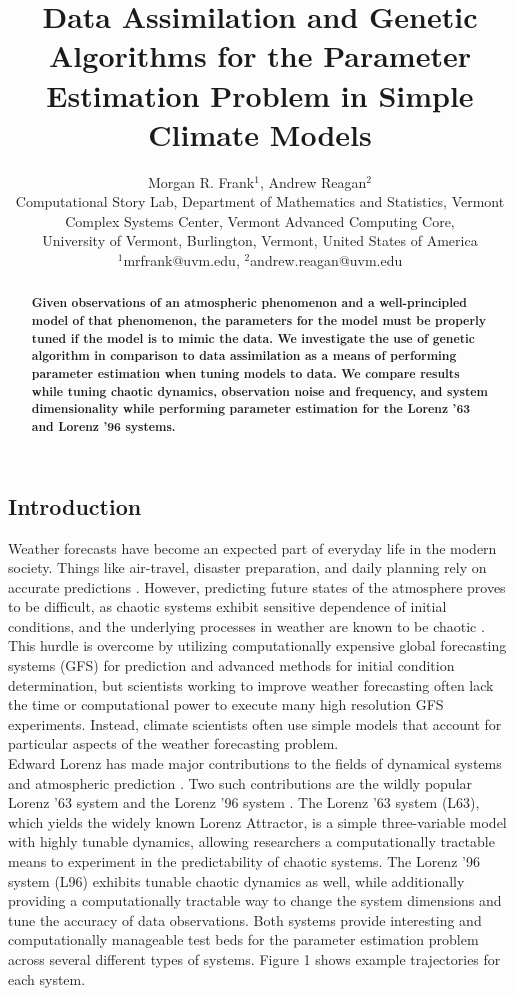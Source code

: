 \documentclass[onecolumn]{article}
\title{Data Assimilation and Genetic Algorithms for the Parameter Estimation Problem in Simple Climate Models}
\author{Morgan R. Frank$^{1}$, Andrew Reagan$^{2}$\\
 {\footnotesize  Computational Story Lab, Department of Mathematics and Statistics, Vermont Complex Systems Center, Vermont Advanced Computing Core,}\\
{\footnotesize University of Vermont, Burlington, Vermont, United States of America }\\
{\footnotesize$^{1}$mrfrank@uvm.edu, $^{2}$andrew.reagan@uvm.edu}}
\begin{document}
\maketitle
\begin{multicols}{2}
\begin{abstract}
\bf\indent Given observations of an atmospheric phenomenon and a well-principled model of that phenomenon, the parameters for the model must be properly tuned if the model is to mimic the data. We investigate the use of genetic algorithm in comparison to data assimilation as a means of performing parameter estimation when tuning models to data. We compare results while tuning chaotic dynamics, observation noise and frequency, and system dimensionality while performing parameter estimation for the Lorenz '63 and Lorenz '96 systems.
\end{abstract}
\section{Introduction}
\indent Weather forecasts have become an expected part of everyday life in the modern society.
Things like air-travel, disaster preparation, and daily planning rely on accurate predictions \cite{kerr}.
However, predicting future states of the atmosphere proves to be difficult, as chaotic systems exhibit sensitive dependence of initial conditions, and the underlying processes in weather are  known to be chaotic \cite{farmer,orrell3,D+Y}.
This hurdle is overcome by utilizing computationally expensive global forecasting systems (GFS) for prediction and advanced methods for initial condition determination, but scientists working to improve weather forecasting often lack the time or computational power to execute many high resolution GFS experiments.
Instead, climate scientists often use simple models that account for particular aspects of the weather forecasting problem.\\
\indent Edward Lorenz has made major contributions to the fields of dynamical systems and atmospheric prediction \cite{lorenz95,lorenz68,lorenz98}.
Two such contributions are the wildly popular Lorenz '63 system \cite{lorenzAttr} and the Lorenz '96 system \cite{lorenz96}.
The Lorenz '63 system (L63), which yields the widely known Lorenz Attractor, is a simple three-variable model with highly tunable dynamics, allowing researchers a computationally tractable means to experiment in the predictability of chaotic systems.
The Lorenz '96 system (L96) exhibits tunable chaotic dynamics as well, while additionally providing a computationally tractable way to change the system dimensions and tune the accuracy of data observations.
Both systems provide interesting and computationally manageable test beds for the parameter estimation problem across several different types of systems.
Figure 1 shows example trajectories for each system.\\

\end{multicols}
\end{document}
